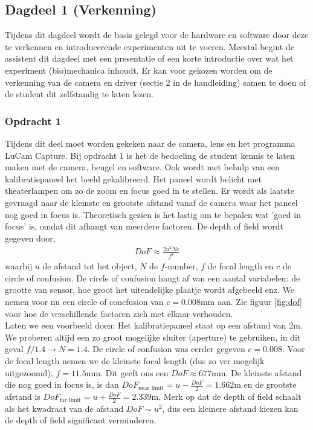 \documentclass{article}
\begin{document}
\subsection{Dagdeel 1 (Verkenning)}
Tijdens dit dagdeel wordt de basis gelegd voor de hardware en software door deze te verkennen en introducerende experimenten uit te voeren. Meestal begint de assistent dit dagdeel met een presentatie of een korte introductie over wat het experiment (bio)mechanica inhoudt. Er kan voor gekozen worden om de verkenning van de camera en driver (sectie 2 in de handleiding) samen te doen of de student dit zelfstandig te laten lezen. 
\subsubsection{Opdracht 1}
Tijdens dit deel moet worden gekeken naar de camera, lens en het programma LuCam Capture. Bij opdracht 1 is het de bedoeling de student kennis te laten maken met de camera, beugel en software. Ook wordt met behulp van een kalibratiepaneel het beeld gekalibreerd. Het paneel wordt belicht met theaterlampen om zo de zoom en focus goed in te stellen. Er wordt als laatste gevraagd naar de kleinste en grootste afstand vanaf de camera waar het paneel nog goed in focus is. Theoretisch gezien is het lastig om te bepalen wat 'goed in focus' is, omdat dit afhangt van meerdere factoren. De depth of field wordt gegeven door,
\begin{align*}
DoF \approx \frac{2u^2Nc}{f^2}
\end{align*}
waarbij $u$ de afstand tot het object, $N$ de $f$-number, $f$ de focal length en $c$ de circle of confusion. De circle of confusion hangt af van een aantal variabelen: de grootte van sensor, hoe groot het uitendelijke plaatje wordt afgebeeld enz. We nemen voor nu een circle of concfusion van $c=0.008$mm aan. Zie figuur \ref{fig:dof} voor hoe de verschillende factoren zich met elkaar verhouden.\\ Laten we een voorbeeld doen: Het kalibratiepaneel staat op een afstand van 2m. We proberen altijd een zo groot mogelijke sluiter (aperture) te gebruiken, in dit geval $f/1.4 \to N=1.4$. De circle of confusion was eerder gegeven $c=0.008$. Voor de focal length nemen we de kleinste focal length (dus zo ver mogelijk uitgezoomd), $f=11.5$mm. Dit geeft ons een $DoF\approx 677$mm. De kleinste afstand die nog goed in focus is, is dan $DoF_{\text{near limit}}=u-\frac{DoF}{2}=1.662$m en de grootste afstand is $DoF_{\text{far limit}}=u+\frac{DoF}{2}=2.339$m. Merk op dat de depth of field schaalt als het kwadraat van de afstand $DoF \sim u^2$, dus een kleinere afstand kiezen kan de depth of field significant verminderen.
\end{document}
